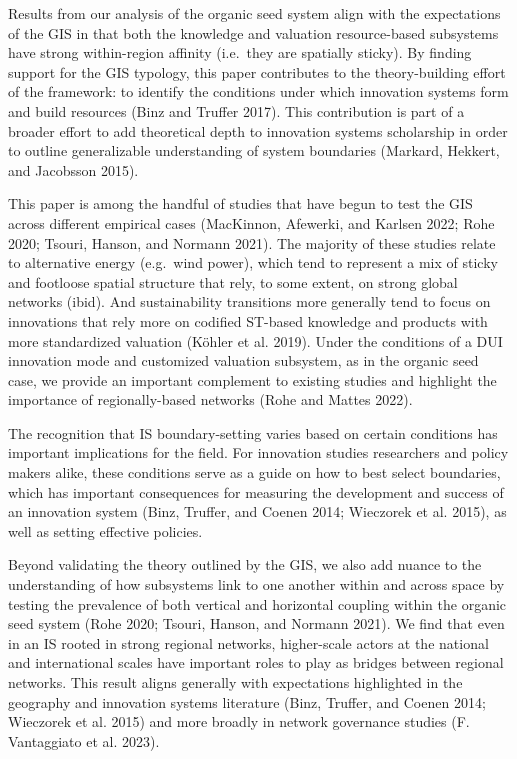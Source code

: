 \documentclass[twoside,12pt,final]{ucthesis-CA2012}
\begin{document}
\begin{ucmainmatter}
Results from our analysis of the organic seed system align with the
expectations of the GIS in that both the knowledge and valuation
resource-based subsystems have strong within-region affinity (i.e.~they
are spatially sticky). By finding support for the GIS typology, this
paper contributes to the theory-building effort of the framework: to
identify the conditions under which innovation systems form and build
resources (Binz and Truffer
2017). This contribution is
part of a broader effort to add theoretical depth to innovation systems
scholarship in order to outline generalizable understanding of system
boundaries (Markard, Hekkert, and Jacobsson
2015).

This paper is among the handful of studies that have begun to test the
GIS across different empirical cases (MacKinnon, Afewerki, and Karlsen
2022; Rohe 2020; Tsouri, Hanson, and Normann
2021). The majority of
these studies relate to alternative energy (e.g.~wind power), which tend
to represent a mix of sticky and footloose spatial structure that rely,
to some extent, on strong global networks (ibid). And sustainability
transitions more generally tend to focus on innovations that rely more
on codified ST-based knowledge and products with more standardized
valuation (Köhler et al.
2019). Under the conditions
of a DUI innovation mode and customized valuation subsystem, as in the
organic seed case, we provide an important complement to existing
studies and highlight the importance of regionally-based networks (Rohe
and Mattes 2022).

The recognition that IS boundary-setting varies based on certain
conditions has important implications for the field. For innovation
studies researchers and policy makers alike, these conditions serve as a
guide on how to best select boundaries, which has important consequences
for measuring the development and success of an innovation system
(Binz, Truffer, and Coenen 2014; Wieczorek et al.
2015), as well as setting
effective policies.

Beyond validating the theory outlined by the GIS, we also add nuance to
the understanding of how subsystems link to one another within and
across space by testing the prevalence of both vertical and horizontal
coupling within the organic seed system (Rohe 2020; Tsouri, Hanson, and
Normann 2021). We find that
even in an IS rooted in strong regional networks, higher-scale actors at
the national and international scales have important roles to play as
bridges between regional networks. This result aligns generally with
expectations highlighted in the geography and innovation systems
literature (Binz, Truffer, and Coenen 2014; Wieczorek et al.
2015) and more broadly in
network governance studies (F. Vantaggiato et al.
2023).


\end{ucmainmatter}
\end{document}
